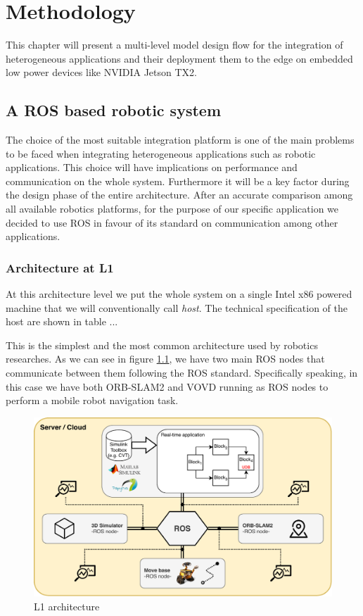 \chapter{Methodology} \label{chap:methodology}
This chapter will present a multi-level model design flow for the integration of heterogeneous applications and their deployment them to the edge on embedded low power devices like NVIDIA Jetson TX2.


\section{A ROS based robotic system}
The choice of the most suitable integration platform is one of the main problems to be faced when integrating heterogeneous applications such as robotic applications. This choice will have implications on performance and communication on the whole system. Furthermore it will be a key factor during the design phase of the entire architecture.
After an accurate comparison among all available robotics platforms, for the purpose of our specific application we decided to use ROS \cite{ROS} in favour of its standard on communication among other applications.

\subsection{Architecture at L1}
At this architecture level we put the whole system on a single Intel x86 powered machine that we will conventionally call \textit{host}. The technical specification of  the host are shown in table ... %

This is the simplest and the most common architecture used by robotics researches. As we can see in figure \ref{fig:l1arch}, we have two main ROS nodes that communicate between them following the ROS standard. Specifically speaking, in this case we have both ORB-SLAM2 and VOVD running as ROS nodes to perform a mobile robot navigation task.

\begin{figure}
	\centering
	\includegraphics[width=\textwidth]{images/L1_arch}
	\caption{L1 architecture}
	\label{fig:l1arch}
\end{figure}


